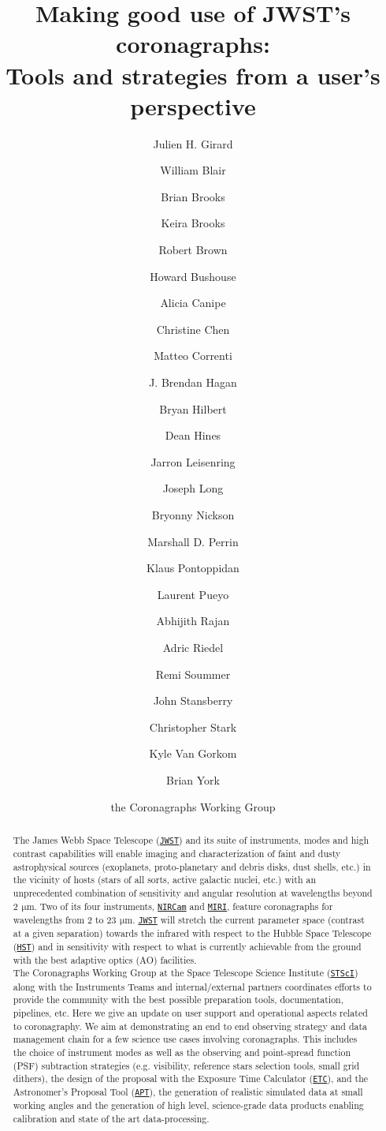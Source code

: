 \documentclass[]{spie}  %
\title{Making good use of JWST's coronagraphs:\\ Tools and strategies from a user's perspective}
\author[a]{Julien H. Girard}
\author[a]{William Blair}
\author[a]{Brian Brooks}
\author[a]{Keira Brooks}
\author[a]{Robert Brown}
\author[a]{Howard Bushouse}
\author[a]{Alicia Canipe}
\author[a]{Christine Chen}
\author[a]{Matteo Correnti}
\author[a]{J. Brendan Hagan}
\author[a]{Bryan Hilbert}
\author[a]{Dean Hines}
\author[b]{Jarron Leisenring}
\author[b]{Joseph Long}
\author [a]{Bryonny Nickson}
\author[a]{Marshall D. Perrin}
\author[a]{Klaus Pontoppidan}
\author[a]{Laurent Pueyo}
\author[a]{Abhijith Rajan}
\author[a]{Adric Riedel}
\author[a]{Remi Soummer}
\author[a]{John Stansberry}
\author[a]{Christopher Stark}
\author[c]{Kyle Van Gorkom}
\author[a]{Brian York}
\author[a]{the Coronagraphs Working Group}
\affil[a]{Space Telescope Science Institute (STScI), 3700 San Martin Dr, Baltimore MD, 21218, USA}
\affil[b]{Steward Observatory, University of Arizona, Tucson, 933 N Cherry Ave., Tucson, AZ 85721}
\affil[c]{College of Optical Sciences, University of Arizona, Tucson, AZ 85719, USA}
\newcommand{\todo}[1]{\textcolor{red}{[#1]}}
\newcommand{\micron}{$\SI{}{\, \micro\meter}$\xspace}
\newcommand{\stsci}{{\tt \href{https://www.stsci.edu}{STScI}}\xspace}
\newcommand{\jwst}{{\tt \href{https://jwst.stsci.edu}{JWST}}\xspace}
\newcommand{\hst}{{\tt \href{https://hst.stsci.edu}{HST}}\xspace}
\newcommand{\nircam}{{\tt \href{https://jwst.stsci.edu/instrumentation/nircam}{NIRCam}}\xspace}
\newcommand{\miri}{{\tt \href{https://jwst.stsci.edu/instrumentation/miri}{MIRI}}\xspace}
\newcommand{\etc}{{\tt \href{https://jwst.etc.stsci.edu/}{ETC}}\xspace}
\newcommand{\apt}{{\tt \href{http://www.stsci.edu/hst/proposing/apt}{APT}}\xspace}
\begin{document}
 
\maketitle

\begin{abstract}
The James Webb Space Telescope (\jwst) and its suite of instruments, modes and high contrast capabilities will enable imaging and characterization of faint and dusty astrophysical sources\cite{beichman2012_spie_science_nircam, boccaletti2004_MIRI_exoplanets, boccaletti2005_MIRI_exoplanets} (exoplanets, proto-planetary and debris disks, dust shells, etc.) in the vicinity of hosts (stars of all sorts, active galactic nuclei, etc.) with an unprecedented combination of sensitivity and angular resolution at wavelengths beyond 2\micron. Two of its four instruments, \nircam\cite{greene2010_spie_nircam, beichman2014_nircam} and \miri\cite{boccaletti2015_MIRI_coro}, feature coronagraphs\cite{krist2007_spie_disk, krist2010_spie_jwst_occulters} for wavelengths from 2 to 23\micron. \jwst will stretch the current parameter space (contrast at a given separation) towards the infrared with respect to the Hubble Space Telescope (\hst) and in sensitivity with respect to what is currently achievable from the ground with the best adaptive optics (AO) facilities.\\
The Coronagraphs Working Group at the Space Telescope Science Institute (\stsci)  along with the Instruments Teams and internal/external partners coordinates efforts to provide the community with the best possible preparation tools, documentation, pipelines, etc. Here we give an update on user support and operational aspects related to coronagraphy. We aim at demonstrating an end to end observing strategy and data management chain for a few science use cases involving coronagraphs. This includes the choice of instrument modes as well as the observing and point-spread function (PSF) subtraction strategies (e.g. visibility, reference stars selection tools, small grid dithers), the design of the proposal with the Exposure Time Calculator (\etc), and the Astronomer's Proposal Tool (\apt), the generation of realistic simulated data at small working angles and the generation of high level, science-grade data products enabling calibration and state of the art data-processing.

\end{abstract}
\end{document}
